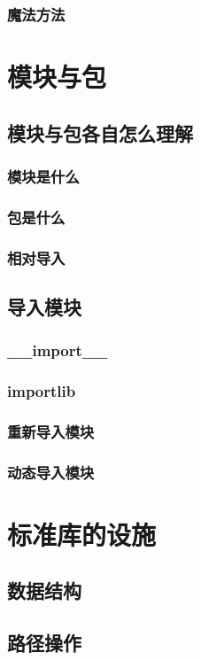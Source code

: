 \documentclass{ctexbook}
\begin{document}
	\section{魔法方法}

\part{模块与包}

	\chapter{模块与包各自怎么理解}
		\section{模块是什么}
		\section{包是什么}
		\section{相对导入}

	\chapter{导入模块}
		\section{\_\_import\_\_}
		\section{importlib}
		\section{重新导入模块}
		\section{动态导入模块}

\part{标准库的设施}

	\chapter{数据结构}
	\chapter{路径操作}
\end{document}

